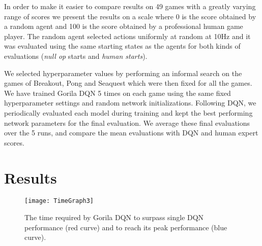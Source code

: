 \documentclass{article}
\begin{document}
In order to make it easier to compare results on 49 games with a greatly varying range of scores we present the results on a scale where 0 is the score obtained by a random agent and 100 is the score obtained by a professional human game player.
The random agent selected actions uniformly at random at 10Hz and it was evaluated using the same starting states as the agents for both kinds of evaluations ({\it null op} starts and {\it human starts}).

We selected hyperparameter values by performing an informal search on the games of Breakout, Pong and Seaquest which were then fixed for all the games.
We have trained Gorila DQN 5 times on each game using the same fixed hyperparameter settings and random network initializations. Following DQN, we periodically evaluated each model during training and kept the best performing network parameters for the final evaluation. We average these final evaluations over the 5 runs, and compare the mean evaluations with DQN and human expert scores.

 

\section {Results}

\begin{figure}[ht]
	\vskip -0.1in
	\begin{center}
		\centerline{\texttt{[image: TimeGraph3]}}
		\caption{
			The time required by Gorila DQN to surpass single DQN performance (red curve) and to reach its peak performance (blue curve). 
		}
		\label{fig:time}
	\end{center}
	\vskip -0.2in
\end{figure}
\end{document}
